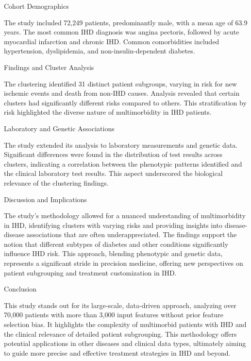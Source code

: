 Cohort Demographics

The study included 72,249 patients, predominantly male, with a mean age of 63.9 years. The most common IHD diagnosis was angina pectoris, followed by acute myocardial infarction and chronic IHD. Common comorbidities included hypertension, dyslipidemia, and non-insulin-dependent diabetes.

Findings and Cluster Analysis

The clustering identified 31 distinct patient subgroups, varying in risk for new ischemic events and death from non-IHD causes. Analysis revealed that certain clusters had significantly different risks compared to others. This stratification by risk highlighted the diverse nature of multimorbidity in IHD patients.

Laboratory and Genetic Associations

The study extended its analysis to laboratory measurements and genetic data. Significant differences were found in the distribution of test results across clusters, indicating a correlation between the phenotypic patterns identified and the clinical laboratory test results. This aspect underscored the biological relevance of the clustering findings.

Discussion and Implications

The study's methodology allowed for a nuanced understanding of multimorbidity in IHD, identifying clusters with varying risks and providing insights into disease-disease associations that are often underappreciated. The findings support the notion that different subtypes of diabetes and other conditions significantly influence IHD risk. This approach, blending phenotypic and genetic data, represents a significant stride in precision medicine, offering new perspectives on patient subgrouping and treatment customization in IHD.

Conclusion

This study stands out for its large-scale, data-driven approach, analyzing over 70,000 patients with more than 3,000 input features without prior feature selection bias. It highlights the complexity of multimorbid patients with IHD and the clinical relevance of detailed patient subgrouping. This methodology offers potential applications in other diseases and clinical data types, ultimately aiming to guide more precise and effective treatment strategies in IHD and beyond.

